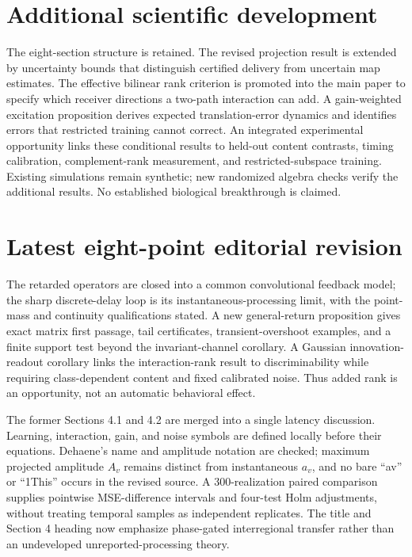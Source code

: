 \documentclass[11pt,a4paper]{article}
\begin{document}
\section*{Additional scientific development}
The eight-section structure is retained. The revised projection result is extended by uncertainty bounds that distinguish certified delivery from uncertain map estimates. The effective bilinear rank criterion is promoted into the main paper to specify which receiver directions a two-path interaction can add. A gain-weighted excitation proposition derives expected translation-error dynamics and identifies errors that restricted training cannot correct. An integrated experimental opportunity links these conditional results to held-out content contrasts, timing calibration, complement-rank measurement, and restricted-subspace training. Existing simulations remain synthetic; new randomized algebra checks verify the additional results. No established biological breakthrough is claimed.

\section*{Latest eight-point editorial revision}
The retarded operators are closed into a common convolutional feedback model; the sharp discrete-delay loop is its instantaneous-processing limit, with the point-mass and continuity qualifications stated. A new general-return proposition gives exact matrix first passage, tail certificates, transient-overshoot examples, and a finite support test beyond the invariant-channel corollary. A Gaussian innovation-readout corollary links the interaction-rank result to discriminability while requiring class-dependent content and fixed calibrated noise. Thus added rank is an opportunity, not an automatic behavioral effect.

The former Sections 4.1 and 4.2 are merged into a single latency discussion. Learning, interaction, gain, and noise symbols are defined locally before their equations. Dehaene's name and amplitude notation are checked; maximum projected amplitude $A_v$ remains distinct from instantaneous $a_v$, and no bare ``av'' or ``1This'' occurs in the revised source. A 300-realization paired comparison supplies pointwise MSE-difference intervals and four-test Holm adjustments, without treating temporal samples as independent replicates. The title and Section 4 heading now emphasize phase-gated interregional transfer rather than an undeveloped unreported-processing theory.
\end{document}
